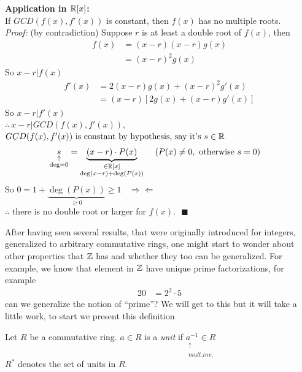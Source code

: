 \begin{example}
\textbf{Application in ${\mathbb{R}}[x]$:} \\
If $GCD(f(x),f'(x))$ is constant, then $f(x)$ has no multiple roots. \\ \steezybreak
\textit{Proof:} (by contradiction)
Suppose $r$ is at least a double root of $f(x)$, then
\begin{align}
    f(x)&= (x-r)(x-r)g(x) \nonumber \\
    &= (x-r)^2 g(x) \nonumber
\end{align}
So $x-r|f(x)$
\begin{align}
    f'(x)&=2(x-r)g(x)+(x-r)^2 g'(x) \nonumber \\
    &= (x-r)[2g(x)+(x-r)g'(x)] \nonumber
\end{align}
So $x-r|f'(x)$ \\
$ \therefore \ x-r| GCD(f(x),f'(x)), $ \\
$GCD(f(x),f'(x))\text{ is constant by hypothesis, say it's }s\in {\mathbb{R}}$
\begin{align}
    \underset{\substack{\uparrow \\ \deg=0}}{s}&= \underbrace{(x-r)\cdot P(x)}_{\substack{\in {\mathbb{R}}[x] \\ \deg(x-r)+\deg(P(x))}} \ \ \ \ (P(x)\neq 0, \text{ otherwise } s=0) \nonumber
\end{align}
So $0= 1+ \underbrace{\deg(P(x))}_{\geq 0} \geq 1 \ \ \ \ \Rightarrow \Leftarrow$ \\
$\therefore$ there is no double root or larger for $f(x). \ \ \ \blacksquare$

\end{example}

After having seen several results, that were originally introduced for integers, generalized to
arbitrary commutative rings, one might start to wonder about other properties that ${\mathbb{Z}}$ has and
whether they too can be generalized.
For example, we know that element in ${\mathbb{Z}}$ have unique prime factorizations, for example
\begin{align}
    20&= 2^2\cdot 5 \nonumber
\end{align}
can we generalize the notion of ``prime''? We will get to this but it will take a little work, to
start we present this definition
\begin{definition}
    Let $R$ be a commutative ring. $a\in R$ is a \textit{unit} if
    $\underset{\substack{\uparrow \ \ \ \ \ \  \ \\ mult. inv.}}{a^{-1}\in R}$ \\ \steezybreak
    $R^*$ denotes the set of units in $R$.
\end{definition}

